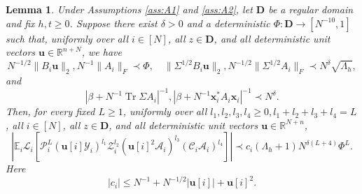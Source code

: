 \documentclass[10pt,a4paper]{amsart}
\newtheorem{lemma}{Lemma}
\def\E{\mathbb{E}}
\def\R{\mathbb{R}}
\def\Tr{\operatorname{Tr}}
\def\bD{\mathbf{D}}
\def\cA{\mathcal{A}}
\def\cC{\mathcal{C}}
\def\cL{\mathcal{L}}
\def\cP{\mathcal{P}}
\def\cY{\mathcal{Y}}
\def\cZ{\mathcal{Z}}
\def\u{\mathbf{u}}
\def\x{\mathbf{x}}
\begin{document}
\begin{lemma}\label{lem:L_i-bounds}
Under Assumptions \ref{ass:A1} and \ref{ass:A2}, let $\bD$ be a regular domain and fix $h,t\geq 0$. Suppose there exist $\delta>0$ and a deterministic $\Phi:\bD\rightarrow[N^{-10},1]$ such that, uniformly over all $i\in[N]$, all $z\in\bD$, and all deterministic unit vectors $\u\in\R^{n+N}$, we have
\[
    N^{-1/2}\|B_i\u\|_2, N^{-1}\|A_i\|_F\prec\Phi,\quad \|\Sigma^{1/2}B_i\u\|_2, N^{-1/2}\|\Sigma^{1/2}A_i\|_F\prec N^\delta\sqrt{\Lambda_h},
\]
and
\[
    |\beta+N^{-1}\Tr\Sigma A_i|^{-1}, |\beta+N^{-1}\x_i^*A_i\x_i|^{-1}\prec N^\delta.
\]
Then, for every fixed $L\geq 1$, uniformly over all $l_1,l_2,l_3,l_4\geq 0,l_1+l_2+l_3+l_4=L$, all $i\in[N]$, all $z\in\bD$, and all deterministic unit vectors $\u\in\R^{N+n}$,
\[
    |\E_i\cL_i[\cP_i^L(\u[i]\cY_i)^{l_1}\cZ_i^{l_2}(\u[i]^2\cA_i)^{l_3}(\cC_i\cA_i)^{l_4}]|\prec c_i(\Lambda_h+1) N^{\delta (L+4)}\Phi^{L}.
\]
Here
\[
    |c_i|\leq N^{-1}+N^{-1/2}|\u[i]|+\u[i]^2.
\]
\end{lemma}
\end{document}
